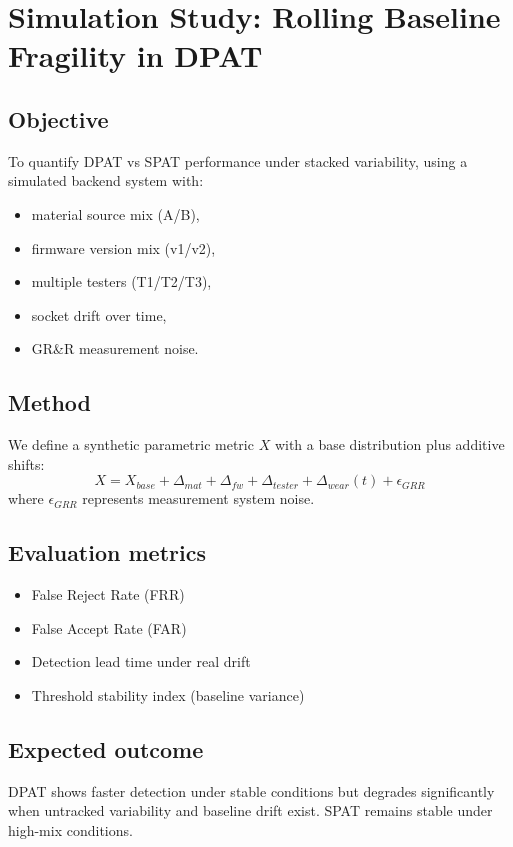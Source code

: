\documentclass[11pt,a4paper]{article}
\begin{document}
	\section{Simulation Study: Rolling Baseline Fragility in DPAT}
	
	\subsection{Objective}
	To quantify DPAT vs SPAT performance under stacked variability, using a simulated backend system with:
	\begin{itemize}[leftmargin=1.2em]
		\item material source mix (A/B),
		\item firmware version mix (v1/v2),
		\item multiple testers (T1/T2/T3),
		\item socket drift over time,
		\item GR\&R measurement noise.
	\end{itemize}
	
	\subsection{Method}
	We define a synthetic parametric metric $X$ with a base distribution plus additive shifts:
	\[
	X = X_{base} + \Delta_{mat} + \Delta_{fw} + \Delta_{tester} + \Delta_{wear}(t) + \epsilon_{GRR}
	\]
	where $\epsilon_{GRR}$ represents measurement system noise.
	
	\subsection{Evaluation metrics}
	\begin{itemize}[leftmargin=1.2em]
		\item False Reject Rate (FRR)
		\item False Accept Rate (FAR)
		\item Detection lead time under real drift
		\item Threshold stability index (baseline variance)
	\end{itemize}
	
	\subsection{Expected outcome}
	DPAT shows faster detection under stable conditions but degrades significantly when untracked variability
	and baseline drift exist. SPAT remains stable under high-mix conditions.
	
\end{document}
